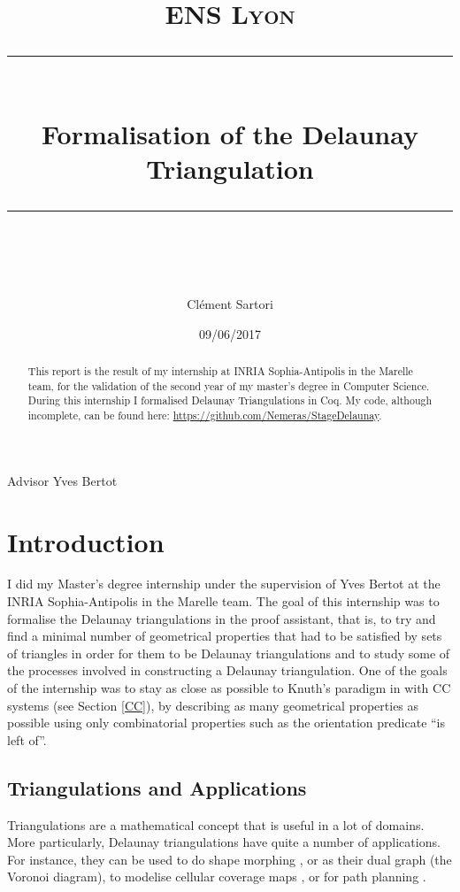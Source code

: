 \documentclass[a4paper,10pt]{article}
\title{
\normalfont \normalsize 
\textsc{ENS Lyon} \\
[10pt] 
\rule{\linewidth}{0.5pt} \\[6pt] 
\huge Formalisation of the Delaunay Triangulation \\
\rule{\linewidth}{2pt}  \\[10pt]
}
\author{Clément Sartori}
\date{\normalsize 09/06/2017}
\begin{document}
\maketitle
\noindent
Advisor \dotfill Yves Bertot \\
\thispagestyle{empty}
\setcounter{page}{0} 

\maketitle

\begin{abstract}
  This report is the result of my internship at INRIA Sophia-Antipolis in the Marelle team, for the validation of the second year of my master's degree in Computer Science. During this internship I formalised Delaunay Triangulations in Coq. My code, although incomplete, can be found here: \href{https://github.com/Nemeras/StageDelaunay}{https://github.com/Nemeras/StageDelaunay}.
\end{abstract}

\tableofcontents{}

\newpage
\section{Introduction}
I did my Master's degree internship under the supervision of Yves Bertot at the INRIA Sophia-Antipolis in the Marelle team. 
The goal of this internship was to formalise the Delaunay triangulations in the {} proof assistant, that is, to try and find a minimal number of geometrical properties that had to be satisfied by sets of triangles in order for them to be Delaunay triangulations and to study some of the processes involved in constructing a Delaunay triangulation. One of the goals of the internship was to stay as close as possible to Knuth's paradigm in \cite{Knuth92} with CC systems (see Section \ref{CC}), by describing as many geometrical properties as possible using only combinatorial properties such as the orientation predicate ``is left of''.

\subsection{Triangulations and Applications}
Triangulations are a mathematical concept that is useful in a lot of domains. More particularly, Delaunay triangulations have quite a number of applications. For instance, they can be used to do shape morphing \cite{morphing}, or as their dual graph (the Voronoi diagram),  to modelise cellular coverage maps \cite{CelCov}, or for path planning \cite{PathPla}.
\end{document}
